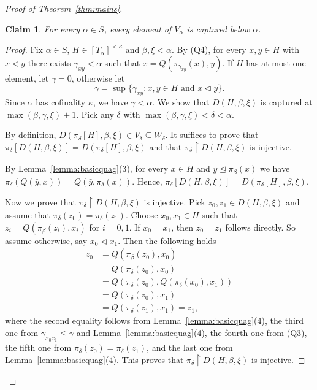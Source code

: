 \documentclass[]{amsart}
\newtheorem{claim}{Claim}[theorem]
\theoremstyle{definition}
\theoremstyle{remark}
\begin{document}
\begin{proof}[Proof of Theorem~\ref{thm:mains}]
\begin{claim}\label{claim:2}
For every  $\alpha \in S$, every element of $V_\alpha$ is captured below $\alpha$.
\end{claim}
\begin{proof}
Fix $\alpha \in S$,  $H \in [T_\alpha]^{<\kappa}$ and $\beta, \xi < \alpha$. By (Q4), for every $x,y \in H$ with $x \lhd y$ there exists $\gamma_{xy} < \alpha$ such that $x = Q(\pi_{\gamma_{xy}}(x), y)$. If $H$ has at most one element, let $\gamma = 0$, otherwise let 
\[
\gamma = \sup\{\gamma_{xy} : x,y \in H \text{ and } x \lhd y\}.
\]
Since $\alpha$ has cofinality $\kappa$, we have $\gamma < \alpha$. We show that  $D(H, \beta, \xi)$ is captured at $\max(\beta,\gamma, \xi) +1 $. Pick any $\delta$ with $\max(\beta, \gamma, \xi) < \delta < \alpha$. 

By definition, $D(\pi_\delta[H], \beta, \xi) \in V_\delta \subseteq W_\delta$. It suffices to prove that $\pi_{\delta}[D(H, \beta, \xi)] = D(\pi_\delta[H], \beta, \xi)$ and that $\pi_{\delta} \upharpoonright D(H, \beta, \xi)$ is injective.


By Lemma~\ref{lemma:basicquag}(3), for every $x \in H$ and $\bar{y} \trianglelefteq \pi_\beta(x)$ we have $\pi_\delta(Q(\bar{y}, x)) = Q(\bar{y}, \pi_\delta(x))$. Hence, $\pi_{\delta}[D(H, \beta, \xi)] = D(\pi_\delta[H], \beta, \xi)$. 

Now we prove that $\pi_{\delta} \upharpoonright D(H, \beta, \xi)$ is injective. Pick $z_0, z_1 \in D(H, \beta, \xi)$ and assume that $\pi_\delta(z_0) = \pi_\delta(z_1)$. Choose $x_0, x_1 \in H$ such that $z_i = Q(\pi_\beta(z_i), x_i)$ for $i = 0,1$. If $x_0 = x_1$, then $z_0 = z_1$ follows directly. So assume otherwise, say $x_0 \lhd x_1$. Then the following holds
\begin{align*}
z_0 &= Q(\pi_\beta(z_0), x_0)\\&= Q(\pi_\delta(z_0), x_0) \\&= Q(\pi_\delta(z_0), Q(\pi_\delta(x_0), x_1)) \\&= Q(\pi_\delta(z_0), x_1) \\&= Q(\pi_\delta(z_1), x_1) = z_1,
\end{align*}
where the second equality follows from Lemma~\ref{lemma:basicquag}(4), the third one from $\gamma_{x_0 x_1} \le \gamma$ and Lemma~\ref{lemma:basicquag}(4), the fourth one from (Q3), the fifth one from $\pi_\delta(z_0) = \pi_\delta(z_1)$, and the last one from Lemma~\ref{lemma:basicquag}(4). This proves that $\pi_{\delta} \upharpoonright D(H, \beta, \xi)$ is injective.
\end{proof}




\end{proof}
\end{document}
